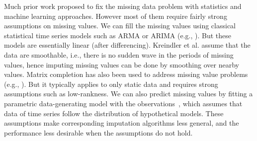 \documentclass{article}
\begin{document}
Much prior work proposed to fix the missing data problem with statistics and machine learning approaches. However most of them require fairly strong assumptions on missing values.
We can fill the missing values using classical statistical time series models such as ARMA or ARIMA (e.g., \cite{ansley1984estimation}). But these models are essentially 
linear (after differencing).
Kreindler et al. \cite{kreindler2012effects} assume that the data are smoothable, i.e., there is no sudden wave in the periods of missing values,
hence imputing missing values can be done by smoothing over nearby values. 
Matrix completion has also been used to address missing value problems (e.g.,  \cite{wang2006unifying,yu2016temporal}). But it typically applies to only static data and requires strong assumptions such as low-rankness.
We can also predict missing values by fitting a parametric data-generating model with the observations~\cite{fung2006methods,azur2011multiple}, which assumes that data of time series follow the distribution of hypothetical models.
These assumptions make corresponding imputation algorithms less general, and the performance less desirable when the assumptions do not hold.
\end{document}
